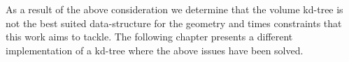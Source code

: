 As a result of the above consideration we determine that the volume kd-tree is not the best suited data-structure for the geometry and times constraints that this work aims to tackle. The following chapter presents a different implementation of a kd-tree where the above issues have been solved.\\



